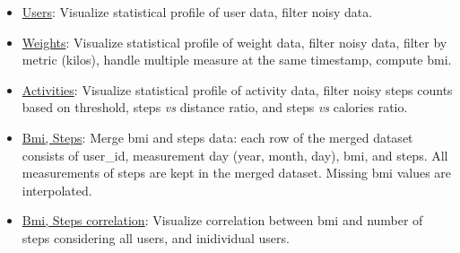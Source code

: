 \documentclass[11pt]{iopart}
\begin{document}
\begin{itemize}
\item  \href{http://htmlpreview.github.io/?https://github.com/renatalucia/activity-tracker/blob/master/data_exploration/users_filter.html}{Users}: Visualize statistical profile of user data, filter noisy data.
 
 
\item  \href{http://htmlpreview.github.io/?https://github.com/renatalucia/activity-tracker/blob/master/data_exploration/weights_filter.html}{Weights}: Visualize statistical profile of weight data, filter noisy data, filter by metric (kilos), handle multiple measure at the same timestamp, compute bmi.

\item  \href{http://htmlpreview.github.io/?https://github.com/renatalucia/activity-tracker/blob/master/data_exploration/tracker_filter.html}{Activities}: Visualize statistical profile of activity data, filter noisy steps counts based on threshold, steps \textit{vs} distance ratio, and steps \textit{vs} calories ratio.

\item \href{http://htmlpreview.github.io/?https://github.com/renatalucia/activity-tracker/blob/master/data_exploration/bmi_steps.html}{Bmi, Steps}: Merge bmi and steps data: each row of the merged dataset consists of user\_id, measurement day (year, month, day), bmi, and steps. All measurements of steps are kept in the merged dataset. Missing bmi values are interpolated. 

\item  \href{http://htmlpreview.github.io/?https://github.com/renatalucia/activity-tracker/blob/master/data_exploration/bmi_steps_correlation.html}{Bmi, Steps correlation}: Visualize correlation between bmi and number of steps considering all users, and inidividual users.
\end{itemize}




\end{document}
